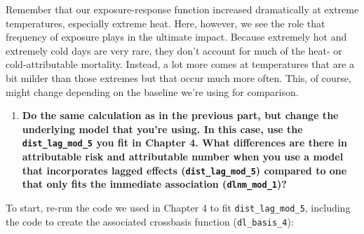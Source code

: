 \documentclass[
]{book}
\newenvironment{Shaded}{\begin{snugshade}}{\end{snugshade}}
\newcommand{\DataTypeTok}[1]{\textcolor[rgb]{0.13,0.29,0.53}{#1}}
\newcommand{\DecValTok}[1]{\textcolor[rgb]{0.00,0.00,0.81}{#1}}
\newcommand{\KeywordTok}[1]{\textcolor[rgb]{0.13,0.29,0.53}{\textbf{#1}}}
\newcommand{\NormalTok}[1]{#1}
\newcommand{\OperatorTok}[1]{\textcolor[rgb]{0.81,0.36,0.00}{\textbf{#1}}}
\newcommand{\OtherTok}[1]{\textcolor[rgb]{0.56,0.35,0.01}{#1}}
\newcommand{\StringTok}[1]{\textcolor[rgb]{0.31,0.60,0.02}{#1}}
\providecommand{\tightlist}{%
  \setlength{\itemsep}{0pt}\setlength{\parskip}{0pt}}
\begin{document}
Remember that our exposure-response function increased dramatically at extreme temperatures, especially extreme heat. Here, however, we see the role that frequency of exposure plays in the ultimate impact. Because extremely hot and extremely cold days are very rare, they don't account for much of the heat- or cold-attributable mortality. Instead, a lot more comes at temperatures that are a bit milder than those extremes but that occur much more often. This, of course, might change depending on the baseline we're using for comparison.

\begin{enumerate}
\def\labelenumi{\arabic{enumi}.}
\setcounter{enumi}{2}
\tightlist
\item
  \textbf{Do the same calculation as in the previous part, but change the underlying model that you're using. In this case, use the \texttt{dist\_lag\_mod\_5} you fit in Chapter 4. What differences are there in attributable risk and attributable number when you use a model that incorporates lagged effects (\texttt{dist\_lag\_mod\_5}) compared to one that only fits the immediate association (\texttt{dlnm\_mod\_1})?}
\end{enumerate}

To start, re-run the code we used in Chapter 4 to fit \texttt{dist\_lag\_mod\_5}, including the code to create the associated crossbasis function (\texttt{dl\_basis\_4}):

\begin{Shaded}
\end{Shaded}
\end{document}

